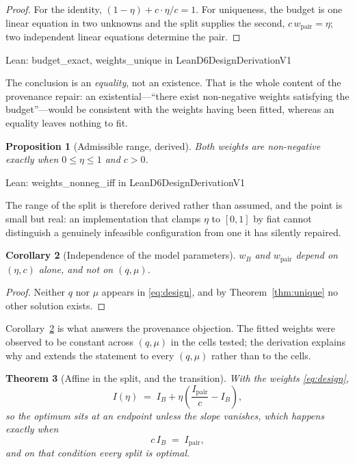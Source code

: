 \documentclass[conference]{IEEEtran}
\newtheorem{theorem}{Theorem}
\newtheorem{proposition}[theorem]{Proposition}
\newtheorem{corollary}[theorem]{Corollary}
\theoremstyle{definition}
\newcommand{\lean}[1]{\textsf{\footnotesize #1}}
\newcommand{\leanbox}[1]{%
  \par\vspace{2pt}\noindent
  {\footnotesize\textsf{Lean: #1}}\par\vspace{2pt}}
\begin{document}
\begin{proof}
For the identity, $(1-\eta)+c\cdot\eta/c=1$. For uniqueness, the budget is one linear
equation in two unknowns and the split supplies the second, $c\,w_{\mathrm{pair}}=\eta$; two
independent linear equations determine the pair.
\end{proof}

\leanbox{\lean{budget\_exact}, \lean{weights\_unique} in
\lean{LeanD6DesignDerivationV1}}

The conclusion is an \emph{equality}, not an existence. That is the whole content of the
provenance repair: an existential---``there exist non-negative weights satisfying the
budget''---would be consistent with the weights having been fitted, whereas an equality leaves
nothing to fit.

\begin{proposition}[Admissible range, derived]
\label{prop:nonneg}
Both weights are non-negative exactly when $0\le\eta\le1$ and $c>0$.
\end{proposition}

\leanbox{\lean{weights\_nonneg\_iff} in \lean{LeanD6DesignDerivationV1}}

The range of the split is therefore derived rather than assumed, and the point is small but
real: an implementation that clamps $\eta$ to $[0,1]$ by fiat cannot distinguish a genuinely
infeasible configuration from one it has silently repaired.

\begin{corollary}[Independence of the model parameters]
\label{cor:indep}
$w_{B}$ and $w_{\mathrm{pair}}$ depend on $(\eta,c)$ alone, and not on $(q,\mu)$.
\end{corollary}

\begin{proof}
Neither $q$ nor $\mu$ appears in \eqref{eq:design}, and by Theorem~\ref{thm:unique} no other
solution exists.
\end{proof}

Corollary~\ref{cor:indep} is what answers the provenance objection. The fitted weights were
observed to be constant across $(q,\mu)$ in the cells tested; the derivation explains why and
extends the statement to every $(q,\mu)$ rather than to the cells.



\begin{theorem}[Affine in the split, and the transition]
\label{thm:affine}
With the weights \eqref{eq:design},
\begin{equation}
I(\eta)\;=\;I_{B}+\eta\left(\frac{I_{\mathrm{pair}}}{c}-I_{B}\right),
\label{eq:affine}
\end{equation}
so the optimum sits at an endpoint unless the slope vanishes, which happens exactly when
\begin{equation}
c\,I_{B}\;=\;I_{\mathrm{pair}},
\label{eq:transitioncond}
\end{equation}
and on that condition every split is optimal.
\end{theorem}
\end{document}
